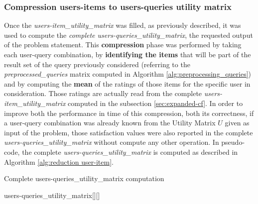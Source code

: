 \subsubsection{Compression users-items to users-queries utility matrix} \label{ch:4.2.3}
Once the \textit{users-item\_utility\_matrix} was filled, as previously described, it was used to compute the \textit{complete users-queries\_utility\_matrix}, the requested output of the problem statement. This \textbf{compression} phase was performed by taking each user-query combination, by \textbf{identifying the items} that will be part of the result set of the query previously considered (referring to the \textit{preprocessed\_queries} matrix computed in Algorithm \ref{alg:preprocessing_queries}) and by computing the \textbf{mean} of the ratings of those items for the specific user in consideration. Those ratings are actually read from the complete \textit{users-item\_utility\_matrix} computed in the subsection \ref{sec:expanded-cf}. In order to improve both the performance in time of this compression, both its correctness, if a user-query combination was already known from the Utility Matrix $U$ given as input of the problem, those satisfaction values were also reported in the complete \textit{users-queries\_utility\_matrix} without compute any other operation. In pseudo-code, the complete \textit{users-queries\_utility\_matrix} is computed as described in Algorithm \ref{alg:reduction user-item}.

\begin{algorithm}
\caption{Complete users-queries\_utility\_matrix computation}\label{alg:reduction user-item}

users-queries\_utility\_matrix[][] \\
\end{algorithm}

